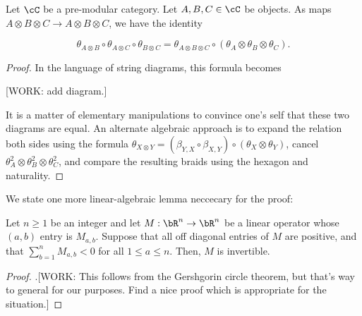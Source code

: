 \begin{lem} Let $\cC$ be a pre-modular category. Let $A,B,C\in \cC$ be objects. As maps $A\otimes B\otimes C \to A\otimes B \otimes C$, we have the identity

$$\theta_{A\otimes B}\circ \theta_{A\otimes C}\circ \theta_{B\otimes C} = \theta_{A\otimes B\otimes C}\circ (\theta_{A}\otimes \theta_{B}\otimes \theta_{C}).$$
\end{lem}
\begin{proof} In the language of string diagrams, this formula becomes

[WORK: add diagram.]

It is a matter of elementary manipulations to convince one's self that these two diagrams are equal. An alternate algebraic approach is to expand the relation both sides using the formula $\theta_{X\otimes Y}=(\beta_{Y,X}\circ \beta_{X,Y})\circ (\theta_{X}\otimes \theta_{Y})$, cancel $\theta_{A}^2\otimes \theta_{B}^2\otimes \theta_{C}^2$, and compare the resulting braids using the hexagon and naturality.
\end{proof}

We state one more linear-algebraic lemma neccecary for the proof:

\begin{lem} Let $n\geq 1$ be an integer and let $M:\bR^n\to \bR^n$ be a linear operator whose $(a,b)$ entry is $M_{a,b}$. Suppose that all off diagonal entries of $M$ are positive, and that $\sum_{b=1}^n M_{a,b}<0$ for all $1\leq a\leq n$. Then, $M$ is invertible.
\end{lem}
\begin{proof}.[WORK: This follows from the Gershgorin circle theorem, but that's way to general for our purposes. Find a nice proof which is appropriate for the situation.]
\end{proof}

